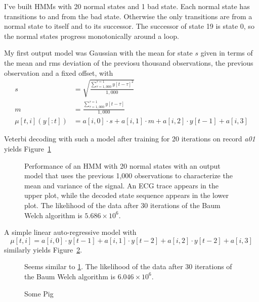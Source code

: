 \documentclass[12pt]{article}
\begin{document}
I've built HMMs with 20 normal states and 1 bad state.  Each normal
state has transitions to and from the bad state.  Otherwise the only
transitions are from a normal state to itself and to its successor.
The successor of state 19 is state 0, so the normal states progress
monotonically around a loop.

My first output model was Gaussian with the mean for state $s$ given
in terms of the mean and rms deviation of the previosu thousand
observations, the previous observation and a fixed offset, with
\begin{align*}
  s &= \sqrt{\frac{\sum_{\tau=1,000}^{\tau=1} y[t-\tau]^2}{1,000}} \\
  m &=  \frac{\sum_{\tau=1,000}^{\tau=1} y[t-\tau]}{1,000} \\
  \mu[t,i](y[:t]) &= a[i,0] \cdot s + a[i,1] \cdot m + a[i,2] \cdot
  y[t-1] + a[i,3]
\end{align*}

Veterbi decoding with such a model after training for 20 iterations on
record \emph{a01} yields Figure~\ref{fig:modelAR1k20}

\begin{figure}
  \centering
  \caption{Performance of an HMM with 20 normal states with an output
    model that uses the previous 1,000 observations to characterize
    the mean and variance of the signal.  An ECG trace appears in the
    upper plot, while the decoded state sequence appears in the lower
    plot.  The likelihood of the data after 30 iterations of the Baum
    Welch algorithm is $5.686 \times 10^{6}$.}
  \label{fig:modelAR1k20}
\end{figure}

A simple linear auto-regressive model with
\begin{equation*}
  \mu[t,i] = a[i,0] \cdot y[t-1] + a[i,1] \cdot y[t-2] + a[i,2] \cdot
  y[t-2]  + a[i,3]
\end{equation*}
similarly yields Figure~\ref{fig:modelAR3_20}.

\begin{figure}
  \centering
    \caption{Seems similar to \ref{fig:modelAR1k20}.  The likelihood
      of the data after 30 iterations of the Baum Welch algorithm is
      $6.046 \times 10^{6}$.}
  \label{fig:modelAR3_20}
\end{figure}

\begin{figure}
  \centering
    \caption{Some Pig}
  \label{fig:modelAR3_300}
\end{figure}
\end{document}
